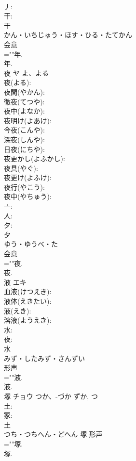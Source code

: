 \documentclass[8pt]{extreport}
\begin{document}
\begin{CJK}{UTF8}{min}
\\	丿: 
\\	干: 
\\	干	
\\	かん・いちじゅう・ほす・ひる・たてかん	
\\	会意 
\\	=""年.
\\	年.
\\	夜	ヤ	よ、よる		
\\	夜(よる): 
\\	夜間(やかん): 
\\	徹夜(てつや): 
\\	夜中(よなか): 
\\	夜明け(よあけ): 
\\	今夜(こんや): 
\\	深夜(しんや): 
\\	日夜(にちや): 
\\	夜更かし(よふかし): 
\\	夜具(やぐ): 
\\	夜更け(よふけ): 
\\	夜行(やこう): 
\\	夜中(やちゅう): 
\\	亠: 
\\	人: 
\\	夕: 
\\	夕	
\\	ゆう・ゆうべ・た	
\\	会意 
\\	=""夜.
\\	夜.
\\	液	エキ			
\\	血液(けつえき): 
\\	液体(えきたい): 
\\	液(えき): 
\\	溶液(ようえき): 
\\	水: 
\\	夜: 
\\	水	
\\	みず・したみず・さんずい	
\\	形声 
\\	=""液.
\\	液.
\\	塚	チョウ	つか、-づか	ずか, つ	
\\	土: 
\\	冢: 
\\	土	
\\	つち・つちへん・どへん	塚	形声 
\\	=""塚.
\\	塚.

\end{CJK}
\end{document}
